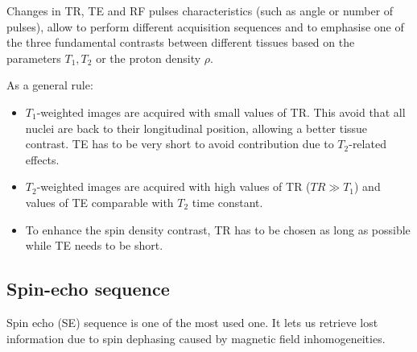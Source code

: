 \documentclass[11pt]{report}
\begin{document}
Changes in TR, TE and RF pulses characteristics (such as angle or number of pulses), allow to perform different acquisition sequences and to emphasise one of the three fundamental contrasts between different tissues based on the parameters $T_1, T_2$ or the proton density $\rho$.

As a general rule:
\begin{itemize}
\item $T_1$-weighted images are acquired with small values of TR. This avoid that all nuclei are back to their longitudinal position, allowing a better tissue contrast. TE has to be very short to avoid contribution due to $T_2$-related effects.
\item $T_2$-weighted images are acquired with high values of TR ($TR \gg T_1$) and values of TE comparable with $T_2$ time constant.
\item To enhance the spin density contrast, TR has to be chosen as long as possible while TE needs to be short.
\end{itemize}


\subsection{Spin-echo sequence}

Spin echo (SE) sequence is one of the most used one.
It lets us retrieve lost information due to spin dephasing caused by magnetic field inhomogeneities.
\end{document}

